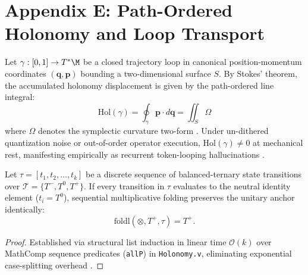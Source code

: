 \section*{Appendix E: Path-Ordered Holonomy and Loop Transport}
\label{app:holonomy}

\begin{definition}
Let $\gamma : [0, 1] \to T^*\M$ be a closed trajectory loop in canonical position-momentum coordinates $(\mathbf{q}, \mathbf{p})$ bounding a two-dimensional surface $S$. By Stokes' theorem, the accumulated holonomy displacement is given by the path-ordered line integral:
\begin{equation}
  \mathrm{Hol}(\gamma) = \oint_\gamma \mathbf{p} \cdot d\mathbf{q} = \iint_S \Omega
\end{equation}
where $\Omega$ denotes the symplectic curvature two-form \cite{earn2001exact}. Under un-dithered quantization noise or out-of-order operator execution, $\mathrm{Hol}(\gamma) \neq 0$ at mechanical rest, manifesting empirically as recurrent token-looping hallucinations \cite{anonymous2026geometry}.
\end{definition}

\begin{proposition}
Let $\tau = [t_1, t_2, \dots, t_k]$ be a discrete sequence of balanced-ternary state transitions over $\mathcal{T} = \{T^-, T^0, T^+\}$. If every transition in $\tau$ evaluates to the neutral identity element ($t_i = T^0$), sequential multiplicative folding preserves the unitary anchor identically:
\begin{equation}
  \mathrm{foldl}(\otimes, T^+, \tau) = T^+.
\end{equation}
\end{proposition}

\begin{proof}
Established via structural list induction in linear time $\mathcal{O}(k)$ over MathComp sequence predicates (\texttt{allP}) in \texttt{Holonomy.v}, eliminating exponential case-splitting overhead \cite{barrett2024smt}.
\end{proof}
